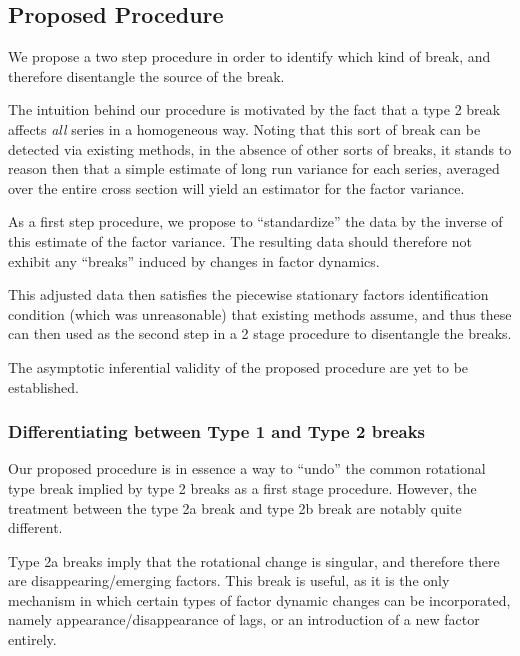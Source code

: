 \documentclass[
]{article}
\begin{document}
\hypertarget{proposed-procedure}{%
\subsection{Proposed Procedure}\label{proposed-procedure}}

We propose a two step procedure in order to identify which kind of
break, and therefore disentangle the source of the break.

The intuition behind our procedure is motivated by the fact that a type
2 break affects \emph{all} series in a homogeneous way. Noting that this
sort of break can be detected via existing methods, in the absence of
other sorts of breaks, it stands to reason then that a simple estimate
of long run variance for each series, averaged over the entire cross
section will yield an estimator for the factor variance.

As a first step procedure, we propose to ``standardize'' the data by the
inverse of this estimate of the factor variance. The resulting data
should therefore not exhibit any ``breaks'' induced by changes in factor
dynamics.

This adjusted data then satisfies the piecewise stationary factors
identification condition (which was unreasonable) that existing methods
assume, and thus these can then used as the second step in a 2 stage
procedure to disentangle the breaks.

The asymptotic inferential validity of the proposed procedure are yet to
be established.

\hypertarget{differentiating-between-type-1-and-type-2-breaks}{%
\subsubsection{Differentiating between Type 1 and Type 2
breaks}\label{differentiating-between-type-1-and-type-2-breaks}}

Our proposed procedure is in essence a way to ``undo'' the common
rotational type break implied by type 2 breaks as a first stage
procedure. However, the treatment between the type 2a break and type 2b
break are notably quite different.

Type 2a breaks imply that the rotational change is singular, and
therefore there are disappearing/emerging factors. This break is useful,
as it is the only mechanism in which certain types of factor dynamic
changes can be incorporated, namely appearance/disappearance of lags, or
an introduction of a new factor entirely.
\end{document}
